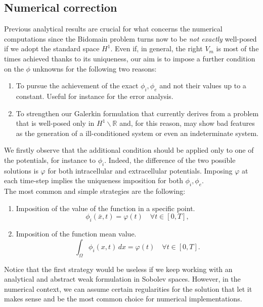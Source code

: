 \documentclass[a4paper,11pt]{article}
\begin{document}
\subsection{Numerical correction} \label{imposition_section}
Previous analytical results are crucial for what concerns the numerical computations since the Bidomain problem turns now to be \emph{not exactly} well-posed if we adopt the standard space $H^1$. Even if, in general, the right $V_m$ is most of the times achieved thanks to its uniqueness, our aim is to impose a further condition on the $\phi$ unknowns for the following two reasons:
\begin{enumerate}
	\item To pursue the achievement of the exact $\phi_i,\phi_e$ and not their values up to a constant. Useful for instance for the error analysis.
	\item To strengthen our Galerkin formulation that currently derives from a problem that is well-posed only in $H^1\backslash \mathbb{R}$ and, for this reason, may show bad features as the generation of a ill-conditioned system or even an indeterminate system.
\end{enumerate}

\vspace{3mm}
\noindent We firstly observe that the additional condition should be applied only to one of the potentials, for instance to $\phi_i$. Indeed, the difference of the two possible solutions is $\varphi$ for both intracellular and extracellular potentials. Imposing $\varphi$ at each time-step implies the uniqueness imposition for both $\phi_i,\phi_e$. \\

\noindent The most common and simple strategies are the following:
\begin{enumerate}
	\item Imposition of the value of the function in a specific point.
	\begin{equation*}
	\phi_i(\bar{x},t) = \varphi(t) \quad \forall t \in [0,T],
	\end{equation*}
	\item Imposition of the function mean value.
	\begin{equation*}
	\int_\Omega \phi_i(x,t)\,dx = \varphi(t) \quad \forall t \in [0,T].
	\end{equation*}
\end{enumerate}

\noindent Notice that the first strategy would be useless if we keep working with an analytical and abstract weak formulation in Sobolev spaces. However, in the numerical context, we can assume certain regularities for the solution that let it makes sense and be the most common choice for numerical implementations. \\
\end{document}

